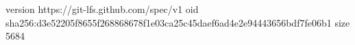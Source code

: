 version https://git-lfs.github.com/spec/v1
oid sha256:d3e52205f8655f268868678f1e03ca25c45daef6ad4e2e94443656bdf7fe06b1
size 5684

